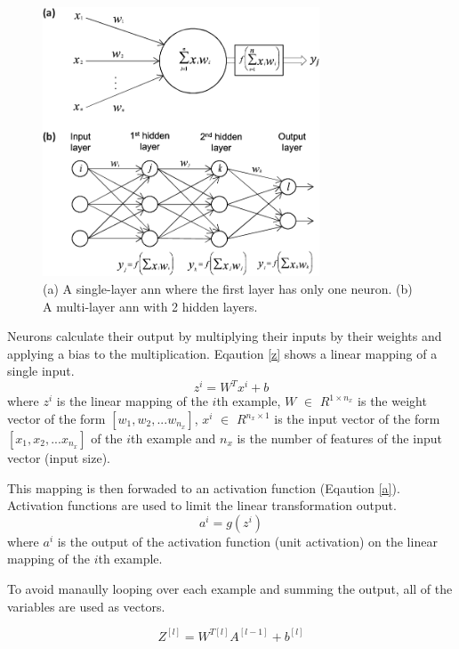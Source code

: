 \documentclass[runningheads]{llncs}
\begin{document}
\begin{figure}[H]
    \label{nn}
    \centering
    \includegraphics[height=8cm]{nn}
    \caption{(a) A single-layer \gls{ann} where the first layer has only one neuron. 
    (b) A multi-layer \gls{ann} with 2 hidden layers. 
    }
\end{figure}

Neurons calculate their output by multiplying their inputs by their weights and applying a bias to the multiplication. Eqaution \ref{z}
shows a linear mapping of a single input.
\begin{equation}
\label{z}
    z^i = W^Tx^i + b
\end{equation}
where $z^i$ is the linear mapping of the $i$th example,  $W$ $\in$ $ R^{1 \times n_{x}} $ is the weight vector of the form $[w_1, w_2, ... w_{n_{x}}]$, 
$x^i$ $\in$ $ R^{n_{x}\times1} $ is the input vector of the form $[x_1, x_2, ... x_{n_{x}}]$ of the $i$th example and $n_{x}$ is the number
of features of the input vector (input size).

This mapping is then forwaded to an activation function (Eqaution \ref{a}).
Activation functions are used to limit the linear transformation output.
\begin{equation}
    \label{a}
        a^i = g(z^i)
\end{equation}
where $a^i$ is the output of the activation function (unit activation) on the linear mapping of the $i$th example.

To avoid manaully looping over each example and summing the output, all of the variables are used
as vectors.

\begin{equation}
    \label{zeq1}
        Z^{[l]} = W^{T[l]}A^{[l-1]} + b^{[l]}
\end{equation}
\end{document}
